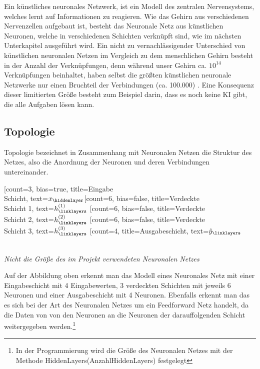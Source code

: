 Ein künstliches neuronales Netzwerk, ist ein Modell des zentralen Nervensystems, welches lernt auf Informationen zu reagieren. Wie das Gehirn aus verschiedenen Nervenzellen aufgebaut ist, besteht das Neuronale Netz aus künstlichen Neuronen, welche in verschiedenen Schichten verknüpft sind, wie im nächsten Unterkapitel ausgeführt wird. Ein nicht zu vernachlässigender Unterschied von künstlichen neuronalen Netzen im Vergleich zu dem menschlichen Gehirn besteht in der Anzahl der Verknüpfungen, denn während unser Gehirn ca. $10^{14}$ Verknüpfungen beinhaltet, haben selbst die größten künstlichen neuronale Netzwerke nur einen Bruchteil der Verbindungen (ca. 100.000) \cite[vgl.][S.1055]{traeger2003kunstliche}. Eine Konsequenz dieser limitierten Größe besteht zum Beispiel darin, dass es noch keine  KI gibt, die alle Aufgaben lösen kann.  
\subsection{Topologie}
Topologie bezeichnet in Zusammenhang mit Neuronalen Netzen die Struktur des Netzes, also die Anordnung der Neuronen und deren Verbindungen untereinander.
\begin{center}


\begin{neuralnetwork}[height=6]
        \newcommand{\x}[2]{$x_#2$}
        \newcommand{\y}[2]{$\hat{y}_#2$}
        \newcommand{\hfirst}[2]{\small $h^{(1)}_#2$}
        \newcommand{\hsecond}[2]{\small $h^{(2)}_#2$}
        \newcommand{\hthird}[2]{\small $h^{(3)}_#2$}
        [count=3, bias=true, title=Eingabe\\Schicht, text=\x]
        \hiddenlayer[count=6, bias=false, title=Verdeckte\\Schicht 1, text=\hfirst] \linklayers
        \hiddenlayer[count=6, bias=false, title=Verdeckte\\Schicht 2, text=\hsecond] \linklayers
         \hiddenlayer[count=6, bias=false, title=Verdeckte\\Schicht 3, text=\hthird] \linklayers
        \outputlayer[count=4, title=Ausgabeschicht, text=\y] \linklayers
    \end{neuralnetwork}\\
    \small{\textit{Nicht die Größe des im Projekt verwendeten Neuronalen Netzes}}
    \end{center}
    Auf der Abbildung oben erkennt man das Modell eines Neuronales Netz mit einer Eingabeschicht mit 4 Eingabewerten, 3 verdeckten Schichten mit jeweils 6 Neuronen und einer Ausgabeschicht mit 4 Neuronen. Ebenfalls erkennt man das es sich bei der Art des Neuronalen Netzes um ein Feedforward Netz handelt, da die Daten von von den Neuronen an die Neuronen der darauffolgenden Schicht weitergegeben werden.\footnote{In der Programmierung wird die Größe des Neuronalen Netzes mit der Methode HiddenLayers(AnzahlHiddenLayers) festgelegt}
